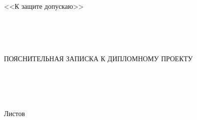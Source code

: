 \begin{center}
  \linespread{1.5}%
  \fontsize{13pt}{13pt}\selectfont%
  \vfill%

  \begin{center}%
    \fontsize{16pt}{16pt}\selectfont%
    \envDiplomMinistr%

    \envDiplomEducation%
    \fontsize{15pt}{16pt}\selectfont\\
    \mbox{\envDiplomUniversity}%
    \fontsize{16pt}{16pt}\selectfont\\
    \envDiplomCathedra%
  \end{center}%
  
  \vfill%

  \begin{flushright}%
    \begin{minipage}[t]{.45\textwidth}%
      <<К защите допускаю>>%

      \envDiplomHeadDepartmentInfo%

      \underline{\hspace{3cm}} \envDiplomHeadDepartmentInitials~\envDiplomHeadCathedraSurname%

      \envDiplomDateInput%
    \end{minipage}%
  \end{flushright}%
  
  \vfill%

  \begin{center}
    \envDiplomTitleUppercased\\
    \hspace{0cm}\\
    ПОЯСНИТЕЛЬНАЯ ЗАПИСКА К ДИПЛОМНОМУ ПРОЕКТУ\\
    \hspace{0cm}\\
    \hspace{0cm}\\
    \begin{center}
      \fontsize{16pt}{16pt}\selectfont%
      \textbf{\envCode}%
    \end{center}
    \hspace{0cm}\\
    \hspace{0cm}\\
    \fontsize{16pt}{16pt}\selectfont%
    Листов \pageref{LastPage}%
  \end{center}%

  \vfill%

  

  \vfill%

  \begin{center}%
    \ESKDtheYear%
  \end{center}%
\end{center}
  